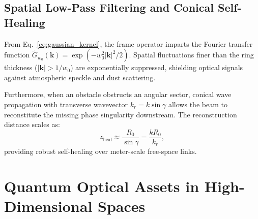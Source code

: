 \documentclass{optica-article}
\begin{document}
\subsection{Spatial Low-Pass Filtering and Conical Self-Healing}

From Eq.~\eqref{eq:gaussian_kernel}, the frame operator imparts the Fourier transfer function $\widetilde{G}_{w_0}(\mathbf{k}) = \exp(-w_0^2 |\mathbf{k}|^2 / 2)$. Spatial fluctuations finer than the ring thickness ($|\mathbf{k}| > 1/w_0$) are exponentially suppressed, shielding optical signals against atmospheric speckle and dust scattering.

Furthermore, when an obstacle obstructs an angular sector, conical wave propagation with transverse wavevector $k_r = k \sin \gamma$ allows the beam to reconstitute the missing phase singularity downstream. The reconstruction distance scales as:
\begin{equation}
z_{\text{heal}} \approx \frac{R_0}{\sin \gamma} = \frac{k R_0}{k_r},
\label{eq:self_healing_distance}
\end{equation}
providing robust self-healing over meter-scale free-space links.

\section{Quantum Optical Assets in High-Dimensional Spaces}
\label{sec:quantum_assets}

\noindent{}
\vspace{0.8em}
\end{document}
